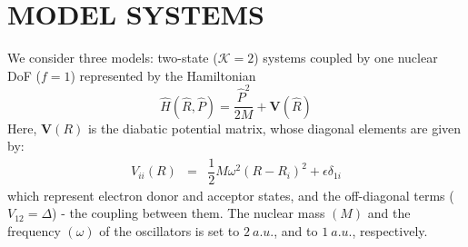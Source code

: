 \documentclass[%
 aip,
 jmp,%
 amsmath,amssymb,
reprint,%
]{revtex4-1}
\begin{document}
\section{\label{sec:level3} MODEL SYSTEMS}
We consider three models: two-state ($\mathcal{K}=2$) systems coupled by one nuclear DoF ($f=1$) represented by the Hamiltonian 
\begin{equation}
\hat{H}(\hat{R},\hat{P}) = \dfrac{\hat{P}^2}{2M} + \mathbf{V}(\hat{R})
\end{equation}
Here, $\mathbf{V}(R)$ is the diabatic potential matrix, whose diagonal elements are given by:
\begin{eqnarray}
V_{ii}(R) & = & \dfrac{1}{2} M \omega^2 (R-R_{i})^2 + \epsilon \delta_{1i} 
\end{eqnarray}
which represent electron donor and acceptor states, and the off-diagonal terms ($V_{12} = \Delta$) - the coupling between them. The nuclear mass $(M)$ and the frequency $(\omega)$ of the oscillators is set to $2\ a.u.$, and to $1\ a.u.$, respectively. 
\end{document}
